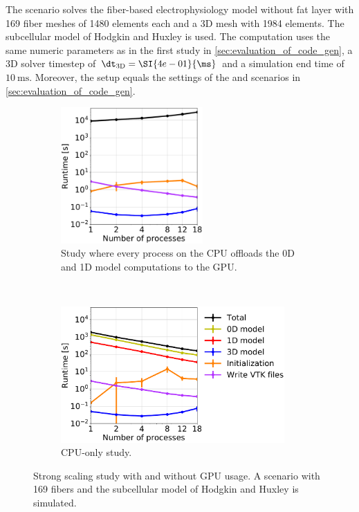 The scenario solves the fiber-based electrophysiology model without fat layer with 169 fiber meshes of 1480 elements each and a 3D mesh with 1984 elements. The subcellular model of Hodgkin and Huxley \cite{Hodgkin1952} is used. The computation uses the same numeric parameters as in the first study in \cref{sec:evaluation_of_code_gen}, a 3D solver timestep of $\dt_\text{3D}=\SI{4e-01}{\ms}$ and a simulation end time of $\SI{10}{\ms}$. Moreover, the setup equals the settings of the  and  scenarios in \cref{sec:evaluation_of_code_gen}.

\begin{figure}%
  \centering%
  \begin{subfigure}[t]{0.45\textwidth}%
    \centering%
    \includegraphics[height=52mm]{images/results/studies/16_hodgkin_huxley_gpu.pdf}%
    \caption{Study where every process on the CPU offloads the 0D and 1D model computations to the GPU.}%
    \label{fig:16_hodgkin_huxley_gpu}%
  \end{subfigure}
  \,
  \begin{subfigure}[t]{0.53\textwidth}%
    \centering%
    \includegraphics[height=52mm]{images/results/studies/16_hodgkin_huxley_cpu.pdf}%
    \caption{CPU-only study.}%
    \label{fig:16_hodgkin_huxley_cpu}%
  \end{subfigure}   
  \caption{Strong scaling study with and without GPU usage. A scenario with 169 fibers and the subcellular model of Hodgkin and Huxley is simulated.}%
  \label{fig:16_hodgkin_huxley_cpu_gpu}%
\end{figure}%

